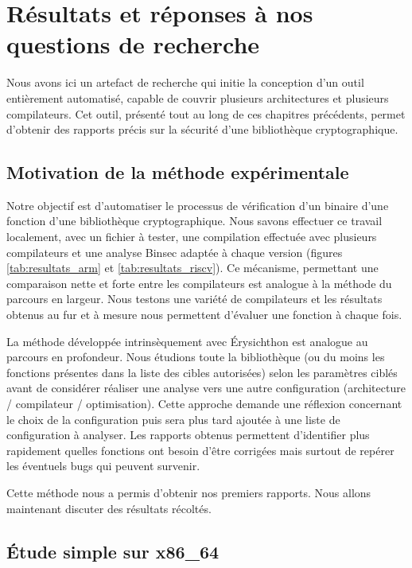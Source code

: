 \chapter{Résultats et réponses à nos questions de recherche}

Nous avons ici un artefact de recherche qui initie la conception d'un outil entièrement automatisé, capable de couvrir plusieurs architectures et plusieurs compilateurs. Cet outil, présenté tout au long de ces chapitres précédents, permet d'obtenir des rapports précis sur la sécurité d'une bibliothèque cryptographique. 

\section{Motivation de la méthode expérimentale}

Notre objectif est d'automatiser le processus de vérification d'un binaire d'une fonction d'une bibliothèque cryptographique. Nous savons effectuer ce travail localement, avec un fichier à tester, une compilation effectuée avec plusieurs compilateurs et une analyse Binsec adaptée à chaque version (\eg figures \ref{tab:resultats_arm} et \ref{tab:resultats_riscv}). Ce mécanisme, permettant une comparaison nette et forte entre les compilateurs est analogue à la méthode du parcours en largeur. Nous testons une variété de compilateurs et les résultats obtenus au fur et à mesure nous permettent d'évaluer une fonction à chaque fois.\medbreak

La méthode développée intrinsèquement avec Érysichthon est analogue au parcours en profondeur. Nous étudions toute la bibliothèque (ou du moins les fonctions présentes dans la liste des cibles autorisées) selon les paramètres ciblés avant de considérer réaliser une analyse vers une autre configuration (architecture / compilateur / optimisation). Cette approche demande une réflexion concernant le choix de la configuration puis sera plus tard ajoutée à une liste de configuration à analyser. Les rapports obtenus permettent d'identifier plus rapidement quelles fonctions ont besoin d'être corrigées mais surtout de repérer les éventuels bugs qui peuvent survenir.\smallbreak

Cette méthode nous a permis d'obtenir nos premiers rapports. Nous allons maintenant discuter des résultats récoltés.

\section{Étude simple sur x86\_64}

